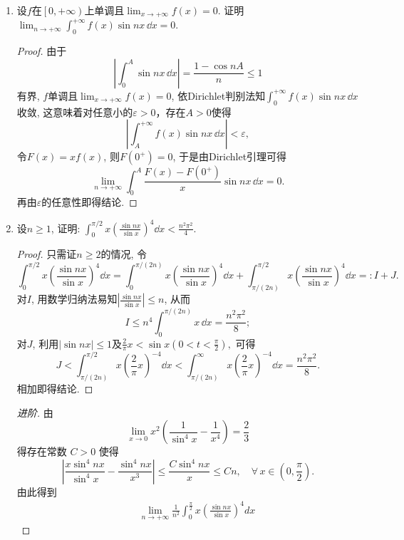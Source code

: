 \begin{quiza}
\begin{enumerate}
\begin{proof}
\textbf{注.} 更高维的等周不等式是，如果$\R^n$的紧集$D$的边界$\partial D$是$n-1$维的光滑流形，那么
\[\frac{|\partial D|^n}{|D|^{n-1}}\geqslant\frac{|\partial B|^n}{|B|^{n-1}},\]
其中$B$是$n$维的球。（$n=2$时即是$L^2/S\geqslant(2\pi)^2/\pi$.）
证明见M. Berger, B. Gostiaux, 微分几何：流形、曲线和曲面：第2版(修订本), 
王耀东译, 法兰西数学精品译丛, 高等教育出版社, 2009年, 6.6.9, pp.218--20.
\end{proof}
\item 设\(f\)在\(\left[0,+\infty\right)\)上单调且\(\lim_{x\rightarrow+\infty}f(x)=0\). 
证明\(\lim_{n\rightarrow+\infty}\int_{0}^{+\infty}f(x)\sin nx\,\dd x=0.\)
\begin{proof}
由于\[\left|\int_{0}^{A}\sin nx\,\dd x\right|=\frac{1-\cos nA}{n}\leqslant 1\]
有界, \(f\)单调且\(\lim_{x\rightarrow+\infty}f(x)=0\), 
依Dirichlet判别法知\(\int_{0}^{+\infty}f(x)\sin nx\,\dd x\)收敛, 
这意味着对任意小的\(\varepsilon>0\)，存在\(A>0\)使得
\[\left|\int_{A}^{+\infty}f(x)\sin nx\,\dd x\right|<\varepsilon,\]
令\(F(x)=xf(x)\), 则\(F(0^+)=0\), 于是由Dirichlet引理可得
\[\lim_{n\rightarrow+\infty}\int_{0}^{A}\frac{F(x)-F(0^+)}{x}\sin nx\,\dd x=0.\]
再由\(\varepsilon\)的任意性即得结论.
\end{proof}
\item 设\(n\geqslant 1\), 证明: \(\int_{0}^{\pi/2}x\left(\frac{\sin nx}{\sin x}\right)^4\dd x<\frac{n^2\pi^2}{4}.\)
\begin{proof}
\def\r{\frac{\sin nx}{\sin x}}
只需证\(n\geqslant 2\)的情况, 令
\[\int_{0}^{\pi/2}x\left(\r\right)^4\dd x
=\int_{0}^{\pi/(2n)}x\left(\r\right)^4\dd x
+\int_{\pi/(2n)}^{\pi/2}x\left(\r\right)^4\dd x=:I+J.\]
对\(I\), 用数学归纳法易知\(\left|\r\right|\leqslant n\), 
从而\[I\leqslant n^4\int_{0}^{\pi/(2n)}x\,\dd x=\frac{n^2\pi^2}{8};\]
对\(J\), 利用\(|\sin nx|\leqslant 1\)及\(\frac{2}{\pi}x<\sin x\left(0< t< \frac{\pi}{2}\right),\) 可得
\[J<\int_{\pi/(2n)}^{\pi/2}x\left(\frac{2}{\pi}x\right)^{-4}\dd x
<\int_{\pi/(2n)}^{\infty}x\left(\frac{2}{\pi}x\right)^{-4}\dd x=\frac{n^2\pi^2}{8}.\]
相加即得结论.
\end{proof}
\begin{proof}[进阶]
由
\[\lim_{x \rightarrow 0} x^2\left(\frac{1}{\sin^4 x}-\frac{1}{x^4}\right)=\frac{2}{3}\]
得存在常数 $C>0$ 使得
\[\left|\frac{x \sin^4 nx}{\sin^4 x}-\frac{\sin^4 nx}{x^3}\right| 
\leqslant \frac{C \sin^4 nx}{x} \leqslant Cn, 
\quad \forall \, x \in\left(0, \frac{\pi}{2}\right).\]
由此得到
\begin{align*}
& \quad \lim_{n \rightarrow+\infty} \frac{1}{n^2} \int_0^{\frac{\pi}{2}} x\left(\frac{\sin nx}{\sin x}\right)^4 d x

\end{align*}
\end{proof}
\end{enumerate}
\end{quiza}
